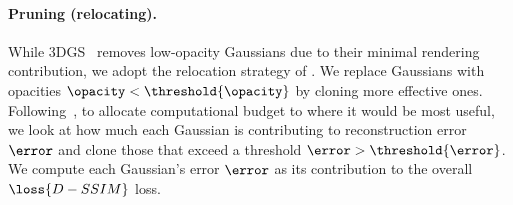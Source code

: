     \paragraph{Pruning (relocating).}
      While 3DGS~\cite{kerbl20233d} removes low-opacity Gaussians due to their
      minimal rendering contribution, we adopt the relocation strategy of
      \citet{kheradmand20243d}.
      We replace Gaussians with opacities $\opacity < \threshold{\opacity}$ by
      cloning more effective ones.
      Following~\citet{bulo2024revising}, to allocate computational budget to
      where it would be most useful, we look at how much each Gaussian is
      contributing to reconstruction error $\error$ and clone those that
      exceed a threshold $\error > \threshold{\error}$.
      We compute each Gaussian's error $\error$ as its contribution to the
      overall $\loss{D-SSIM}$ loss.



      

